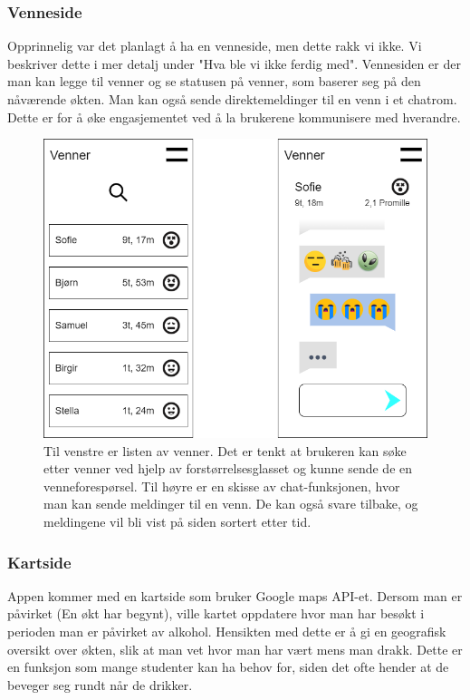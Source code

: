 \subsubsection{Venneside}
Opprinnelig var det planlagt å ha en venneside, men dette rakk vi ikke. Vi beskriver dette i mer detalj under "Hva ble vi ikke ferdig med". Vennesiden er der man kan legge til venner og se statusen på venner, som baserer seg på den nåværende økten. Man kan også sende direktemeldinger til en venn i et chatrom. Dette er for å øke engasjementet ved å la brukerene kommunisere med hverandre.

\begin{figure}[H]
    \centering
    \includegraphics[scale=0.4]{images/lille_promille_friends.drawio.png}
    \caption{Til venstre er listen av venner. Det er tenkt at brukeren kan søke etter venner ved hjelp av forstørrelsesglasset og kunne sende de en venneforespørsel. Til høyre er en skisse av chat-funksjonen, hvor man kan sende meldinger til en venn. De kan også svare tilbake, og meldingene vil bli vist på siden sortert etter tid.}
\end{figure}

\subsubsection{Kartside}
Appen kommer med en kartside som bruker Google maps API-et. Dersom man er påvirket (En økt har begynt), ville kartet oppdatere hvor man har besøkt i perioden man er påvirket av alkohol. Hensikten med dette er å gi en geografisk oversikt over økten, slik at man vet hvor man har vært mens man drakk. Dette er en funksjon som mange studenter kan ha behov for, siden det ofte hender at de beveger seg rundt når de drikker.

